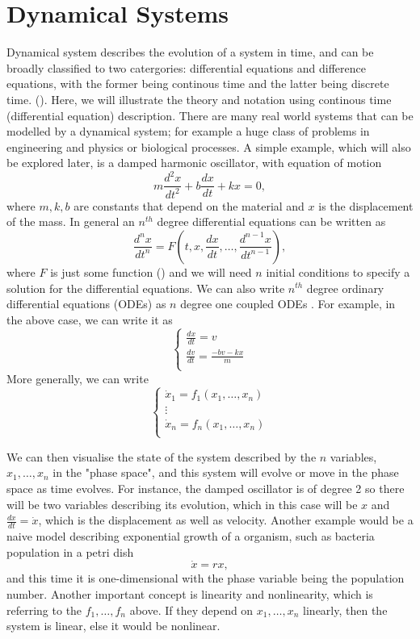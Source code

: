 \documentclass{statsmsc}
\begin{document}
\section{Dynamical Systems}
Dynamical system describes the evolution of a system in time, and can be broadly classified to two catergories: differential equations and difference equations, with the former being continous time and the latter being discrete time. (\cite{strogatz_2019}). 
Here, we will illustrate the theory and notation using continous time (differential equation) description.
There are many real world systems that can be modelled by a dynamical system; for example a huge class of problems in engineering and physics or biological processes. 
A simple example, which will also be explored later, is a damped harmonic oscillator, with equation of motion
\begin{equation}
m\frac{d^2x}{dt^2}+b\frac{dx}{dt}+kx=0,
\label{equ:damped}
\end{equation}
where $m, k, b$ are constants that depend on the material and $x$ is the displacement of the mass.
In general an $n^{th}$ degree differential equations can be written as 
$$
\frac{d^{n} x}{d t^{n}}=F\left(t, x, \frac{d x}{d t}, \ldots, \frac{d^{n-1} x}{d t^{n-1}}\right),
$$
where $F$ is just some function (\cite{glendinning_1994}) and we will need $n$ initial conditions to specify a solution for the differential equations.
We can also write $n^{th}$ degree ordinary differential equations (ODEs) as $n$ degree one coupled ODEs \cite{strogatz_2019}. 
For example, in the above case, we can write it as 
$$
\begin{cases}
  \frac{dx}{dt} = v\\
  \frac{dv}{dt} = \frac{-bv-kx}{m}\\
\end{cases}
$$
More generally, we can write 
$$
\begin{cases}
  \dot{x}_1=f_1(x_1, \dots, x_n)\\ 
  \vdots\\
  \dot{x}_n=f_n(x_1, \dots, x_n)\\ 
\end{cases}
$$

We can then visualise the state of the system described by the $n$ variables,$x_1, \dots, x_n$ in the "phase space", and this system will evolve or move in the phase space as time evolves. 
For instance, the damped oscillator is of degree 2 so there will be two variables describing its evolution, which in this case will be $x$ and $\frac{dx}{dt}=\dot{x}$, which is the displacement as well as velocity.
Another example would be a naive model describing exponential growth of a organism, such as bacteria population in a petri dish
$$
\dot{x}=rx,
$$
and this time it is one-dimensional with the phase variable being the population number.
Another important concept is linearity and nonlinearity, which is referring to the $f_1, \dots ,f_n$ above.
If they depend on $x_1, \dots, x_n$ linearly, then the system is linear, else it would be nonlinear.
\end{document}
